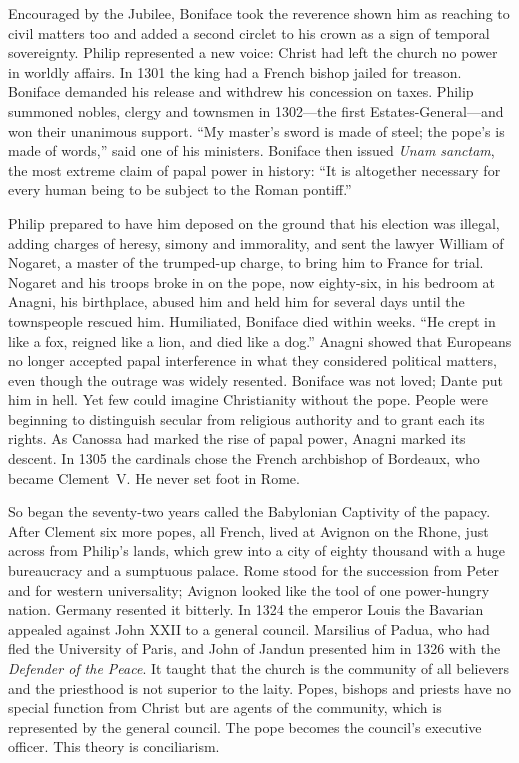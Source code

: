 Encouraged by the Jubilee, Boniface took the reverence shown him as reaching to civil matters too and
added a second circlet to his crown as a sign of temporal sovereignty. Philip represented a new voice:
Christ had left the church no power in worldly affairs. In 1301 the king had a French bishop jailed for treason. Boniface demanded his release and withdrew his concession on taxes. Philip summoned nobles,
clergy and townsmen in 1302---the first Estates-General---and won their unanimous support. ``My
master's sword is made of steel; the pope's is made of words,'' said one of his ministers. Boniface
then issued \emph{Unam sanctam}, the most extreme claim of papal power in history: ``It is altogether
necessary for every human being to be subject to the Roman pontiff.''

Philip prepared to have him deposed on the ground that his election was illegal, adding charges of
heresy, simony and immorality, and sent the lawyer William of Nogaret, a master of the trumped-up
charge, to bring him to France for trial. Nogaret and his troops broke in on the pope, now eighty-six,
in his bedroom at Anagni, his birthplace, abused him and held him for several days until the
townspeople rescued him. Humiliated, Boniface died within weeks. ``He crept in like a fox, reigned
like a lion, and died like a dog.'' Anagni showed that Europeans no longer accepted papal
interference in what they considered political matters, even though the outrage was widely resented.
Boniface was not loved; Dante put him in hell. Yet few could imagine Christianity without the pope.
People were beginning to distinguish secular from religious authority and to grant each its rights.
As Canossa had marked the rise of papal power, Anagni marked its descent. In 1305 the cardinals chose the French archbishop of Bordeaux, who became Clement~V. He never set foot in Rome.

So began the seventy-two years called the Babylonian Captivity of the papacy. After Clement six more
popes, all French, lived at Avignon on the Rhone, just across from Philip's lands, which grew into a
city of eighty thousand with a huge bureaucracy and a sumptuous palace. Rome stood for the succession
from Peter and for western universality; Avignon looked like the tool of one power-hungry nation.
Germany resented it bitterly. In 1324 the emperor Louis the Bavarian appealed against John XXII to a
general council. Marsilius of Padua, who had fled the University of Paris, and John of Jandun
presented him in 1326 with the \emph{Defender of the Peace}. It taught that the church is the
community of all believers and the priesthood is not superior to the laity. Popes, bishops and priests
have no special function from Christ but are agents of the community, which is represented by the
general council. The pope becomes the council's executive officer. This theory is conciliarism.

